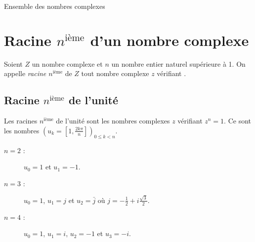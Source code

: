 \begin{chapter}{Ensemble des nombres complexes}
\section{Racine $n^{\text{i\`eme}}$ d'un nombre complexe}
%
\begin{defi}
      Soient $Z$ un nombre complexe et $n$ un nombre entier naturel sup\'erieure \`a 1.
      On appelle \emph{racine $n^{\text{i\`eme}}$} de $Z$ tout nombre complexe $z$ v\'erifiant
            .
\end{defi}
%
\subsection{Racine $n^{\text{i\`eme}}$ de l'unit\'e}
%
Les racines $n^{\text{i\`eme}}$ de l'unit\'e sont les nombres complexes $z$ v\'erifiant $z^n=1$.
Ce sont les nombres $\left(u_k = \left[ 1,\frac{2k\pi}{n} \right] \right)_{0\leq k <n}$.
\begin{ex}\vspace{-1\baselineskip}
      \begin{description}
            \item[$n=2$ :] $u_0 = 1$ et $u_1 = -1$.
            \item[$n=3$ :] $u_0 = 1$, $u_1 = j$ et $u_2 = \bar{j}$ o\`u $j = -\frac{1}{2}+i\frac{\sqrt{3}}{2}$.
            \item[$n=4$ :] $u_0 = 1$, $u_1 = i$, $u_2 = -1$ et $u_3 = -i$.
      \end{description}
\end{ex}


\end{chapter}
